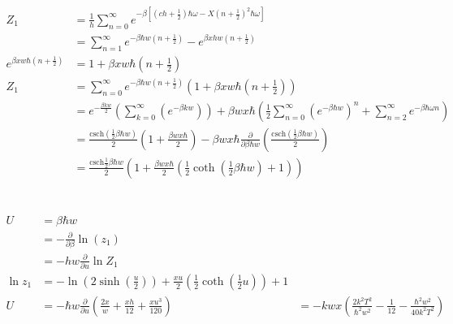 \documentclass{report}
\begin{document}
\section{}

\begin{align*}
	Z_1 &= \frac{1}{h}\sum_{n = 0}^{\infty} e^{- \beta \left[\left( ch + \frac{1}{2}\right) \hbar \omega - X \left( n + \frac{1}{2} \right)^2 \hbar \omega \right]}\\
	&= \sum_{n = 1}^{\infty} e^{-\beta \hbar w \left( n + \frac{1}{2} \right)} - e^{\beta x h w \left( n + \frac{1}{2} \right)}\\
	e^{\beta x w \hbar \left( n + \frac{1}{2} \right)} &= 1 + \beta x w \hbar \left( n + \frac{1}{2} \right)\\
	Z_1 &= \sum_{n = 0}^{\infty} e^{-\beta \hbar w \left( n + \frac{1}{2} \right)} \left( 1 + \beta x w \hbar \left( n + \frac{1}{2} \right) \right)\\
	&= e^{- \frac{\beta k w}{2}}\left( \sum_{k = 0}^{\infty} \left( e^{-\beta k w} \right) \right) + \beta w x \hbar \left( \frac{1}{2}\sum_{n = 0}^{\infty} \left( e^{-\beta \hbar w} \right)^n + \sum_{n = 2}^{\infty} e^{-\beta \hbar \omega n} \right)\\
	&= \frac{\text{csch} \left( \frac{1}{2} \beta \hbar w \right)}{2} \left( 1 + \frac{\beta w x \hbar}{2} \right) - \beta w x \hbar \frac{\partial}{\partial \beta \hbar w} \left( \frac{\text{csch} \left( \frac{1}{2}\beta \hbar w \right)}{2} \right)\\
	&= \frac{\text{csch} \frac{1}{2} \beta \hbar w}{2} \left( 1 + \frac{\beta w x \hbar}{2}\left( \frac{1}{2} \coth \left( \frac{1}{2}\beta \hbar w \right) + 1 \right) \right)
\end{align*}

\section{}

\begin{align*}
	U &= \beta \hbar w\\
	&= - \frac{\partial}{\partial \beta}\ln \left( z_1 \right)\\
	&= - h w \frac{\partial}{\partial u} \ln Z_1\\
	\ln z_1 &= - \ln \left( 2\sinh \left( \frac{u}{2} \right) \right) + \frac{xu}{2} \left( \frac{1}{2} \coth \left( \frac{1}{2} u \right) \right) + 1\\
	U &= - \hbar w \frac{\partial}{\partial u} \left( \frac{2x}{w} + \frac{x h}{12} + \frac{xu^3}{120} \right)
	&= - k w x \left( \frac{2k^2 T^2}{\hbar^2 w^2} - \frac{1}{12} - \frac{\hbar^2 w^2}{40k^2T^2} \right)
\end{align*}
\end{document}

